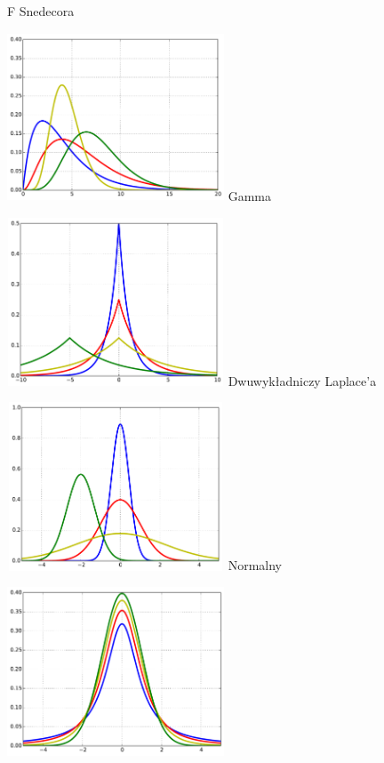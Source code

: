 \begin{multicols}{3}
\begin{Figure}
 F Snedecora
\end{Figure}
\begin{Figure} \centering
 \includegraphics[width=183pt, height=142pt]{img/gamma}
 Gamma
\end{Figure}
\begin{Figure} \centering
 \includegraphics[width=183pt, height=142pt]{img/laplace}
 Dwuwykładniczy Laplace'a
\end{Figure}
\begin{Figure} \centering
 \includegraphics[width=183pt, height=142pt]{img/normalny}
 Normalny
\end{Figure}
\begin{Figure} \centering
 \includegraphics[width=183pt, height=142pt]{img/student}

\end{Figure}
\end{multicols}
